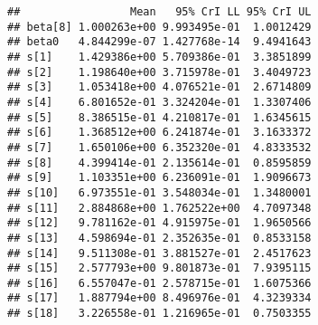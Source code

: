 \documentclass[]{article}
\newenvironment{Shaded}{\begin{snugshade}}{\end{snugshade}}
\newcommand{\CommentTok}[1]{\textcolor[rgb]{0.56,0.35,0.01}{\textit{#1}}}
\newcommand{\ControlFlowTok}[1]{\textcolor[rgb]{0.13,0.29,0.53}{\textbf{#1}}}
\newcommand{\DataTypeTok}[1]{\textcolor[rgb]{0.13,0.29,0.53}{#1}}
\newcommand{\DecValTok}[1]{\textcolor[rgb]{0.00,0.00,0.81}{#1}}
\newcommand{\FloatTok}[1]{\textcolor[rgb]{0.00,0.00,0.81}{#1}}
\newcommand{\KeywordTok}[1]{\textcolor[rgb]{0.13,0.29,0.53}{\textbf{#1}}}
\newcommand{\NormalTok}[1]{#1}
\newcommand{\OperatorTok}[1]{\textcolor[rgb]{0.81,0.36,0.00}{\textbf{#1}}}
\newcommand{\StringTok}[1]{\textcolor[rgb]{0.31,0.60,0.02}{#1}}
\begin{document}
\begin{Shaded}
\end{Shaded}

\begin{verbatim}
##                 Mean   95% CrI LL 95% CrI UL
## beta[8] 1.000263e+00 9.993495e-01  1.0012429
## beta0   4.844299e-07 1.427768e-14  9.4941643
## s[1]    1.429386e+00 5.709386e-01  3.3851899
## s[2]    1.198640e+00 3.715978e-01  3.4049723
## s[3]    1.053418e+00 4.076521e-01  2.6714809
## s[4]    6.801652e-01 3.324204e-01  1.3307406
## s[5]    8.386515e-01 4.210817e-01  1.6345615
## s[6]    1.368512e+00 6.241874e-01  3.1633372
## s[7]    1.650106e+00 6.352320e-01  4.8333532
## s[8]    4.399414e-01 2.135614e-01  0.8595859
## s[9]    1.103351e+00 6.236091e-01  1.9096673
## s[10]   6.973551e-01 3.548034e-01  1.3480001
## s[11]   2.884868e+00 1.762522e+00  4.7097348
## s[12]   9.781162e-01 4.915975e-01  1.9650566
## s[13]   4.598694e-01 2.352635e-01  0.8533158
## s[14]   9.511308e-01 3.881527e-01  2.4517623
## s[15]   2.577793e+00 9.801873e-01  7.9395115
## s[16]   6.557047e-01 2.578715e-01  1.6075366
## s[17]   1.887794e+00 8.496976e-01  4.3239334
## s[18]   3.226558e-01 1.216965e-01  0.7503355
\end{verbatim}
\end{document}
